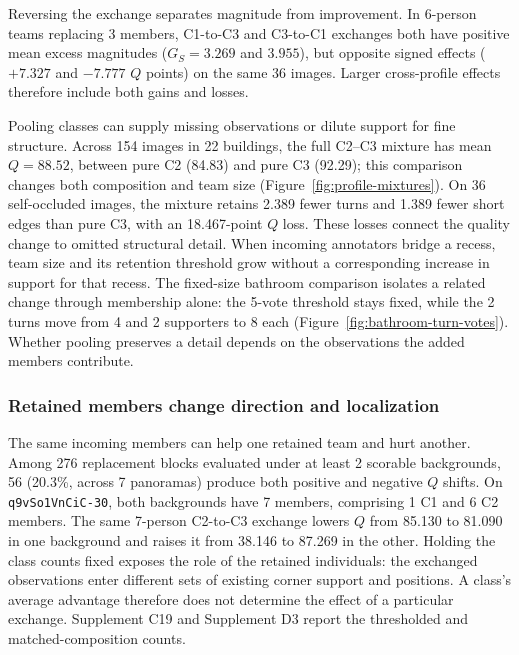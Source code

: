 Reversing the exchange separates magnitude from improvement. In 6-person teams replacing 3 members, C1-to-C3 and C3-to-C1 exchanges both have positive mean excess magnitudes ($G_S=3.269$ and $3.955$), but opposite signed effects ($+7.327$ and $-7.777$ $Q$ points) on the same 36 images. Larger cross-profile effects therefore include both gains and losses.

Pooling classes can supply missing observations or dilute support for fine structure. Across 154 images in 22 buildings, the full C2--C3 mixture has mean $Q=88.52$, between pure C2 (84.83) and pure C3 (92.29); this comparison changes both composition and team size (Figure~\ref{fig:profile-mixtures}). On 36 self-occluded images, the mixture retains 2.389 fewer turns and 1.389 fewer short edges than pure C3, with an 18.467-point $Q$ loss. These losses connect the quality change to omitted structural detail. When incoming annotators bridge a recess, team size and its retention threshold grow without a corresponding increase in support for that recess. The fixed-size bathroom comparison isolates a related change through membership alone: the 5-vote threshold stays fixed, while the 2 turns move from 4 and 2 supporters to 8 each (Figure~\ref{fig:bathroom-turn-votes}). Whether pooling preserves a detail depends on the observations the added members contribute.



\subsubsection{Retained members change direction and localization}

The same incoming members can help one retained team and hurt another. Among 276 replacement blocks evaluated under at least 2 scorable backgrounds, 56 (20.3\%, across 7 panoramas) produce both positive and negative $Q$ shifts. On \texttt{q9vSo1VnCiC-30}, both backgrounds have 7 members, comprising 1 C1 and 6 C2 members. The same 7-person C2-to-C3 exchange lowers $Q$ from 85.130 to 81.090 in one background and raises it from 38.146 to 87.269 in the other. Holding the class counts fixed exposes the role of the retained individuals: the exchanged observations enter different sets of existing corner support and positions. A class's average advantage therefore does not determine the effect of a particular exchange. Supplement C19 and Supplement D3 report the thresholded and matched-composition counts.

